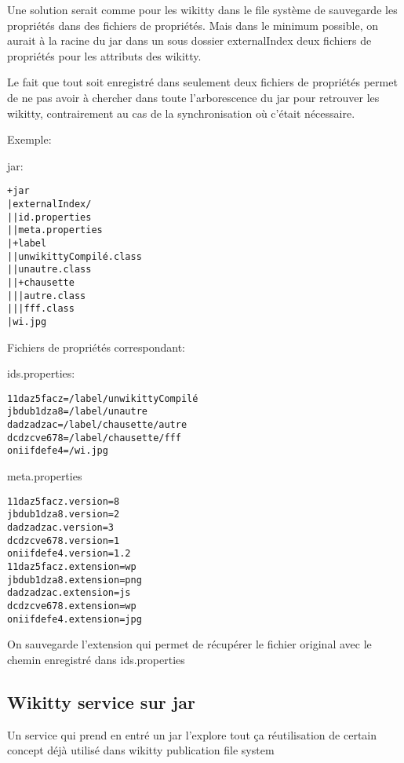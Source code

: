 Une solution serait comme pour les wikitty dans le file système de sauvegarde
les propriétés dans des fichiers de propriétés. Mais dans le minimum possible,
on aurait à la racine du jar dans un sous dossier externalIndex deux fichiers de 
propriétés pour les attributs des wikitty.

Le fait que tout soit enregistré dans seulement deux fichiers de propriétés 
permet de ne pas avoir à chercher dans toute l'arborescence du jar pour 
retrouver les wikitty, contrairement au cas de la synchronisation où c'était 
nécessaire.

Exemple:



jar:
\begin{verbatim}
+jar
|externalIndex/
||id.properties
||meta.properties
|+label
||unwikittyCompilé.class
||unautre.class    
||+chausette
|||autre.class
|||fff.class
|wi.jpg
\end{verbatim}

Fichiers de propriétés correspondant:


ids.properties:
\begin{verbatim}
11daz5facz=/label/unwikittyCompilé 
jbdub1dza8=/label/unautre         
dadzadzac=/label/chausette/autre
dcdzcve678=/label/chausette/fff
oniifdefe4=/wi.jpg
\end{verbatim}


meta.properties
\begin{verbatim}
11daz5facz.version=8
jbdub1dza8.version=2
dadzadzac.version=3
dcdzcve678.version=1
oniifdefe4.version=1.2
11daz5facz.extension=wp
jbdub1dza8.extension=png
dadzadzac.extension=js
dcdzcve678.extension=wp
oniifdefe4.extension=jpg
\end{verbatim}

On sauvegarde l'extension qui permet de récupérer le fichier original avec le
chemin enregistré dans ids.properties

\subsection{Wikitty service sur jar}

Un service qui prend en entré un jar
l'explore tout ça
réutilisation de certain concept déjà utilisé dans wikitty publication file system


